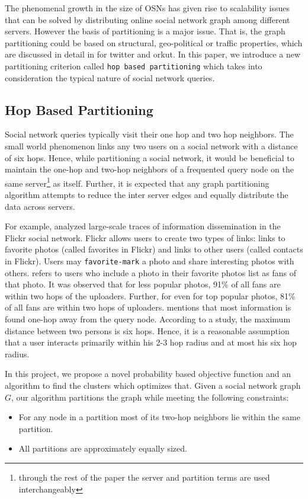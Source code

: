\documentclass[letterpaper]{article}
\begin{document}
    The phenomenal growth in the size of OSNs has given rise to scalability issues that can be solved by distributing online social network graph among different servers. However the basis of partitioning  is a major issue. That is, the graph partitioning could be based on structural, geo-political or traffic properties, which are discussed in detail in \cite{arxviv} for twitter and orkut. In this paper, we introduce a new partitioning criterion called \texttt{hop based partitioning} which takes into consideration the typical nature of social network queries.

\subsection{Hop Based Partitioning}

Social network queries typically visit their one hop and two hop neighbors. The small world phenomenon links any two users on a social network with a distance of six hops. Hence, while partitioning a social network, it would be beneficial to maintain the one-hop and two-hop neighbors of a frequented query node on the same server\footnote{through the rest of the paper the server and partition terms are used interchangeably} as itself. Further, it is expected that any graph partitioning algorithm attempts to reduce the inter server edges and equally distribute the data across servers.

For example, \cite{flickr} analyzed large-scale traces of information
dissemination in the Flickr social network. Flickr allows users to create two types of links: links to favorite
photos (called favorites in Flickr) and links to other users (called contacts in Flickr). Users may \texttt{favorite-mark} a photo
 and share interesting photos with others. \cite{flickr} refers to users who include a photo in their favorite photos list as fans of that photo. It was observed that for less popular photos, 91\% of all fans are within two hops of the uploaders. Further, for even for top popular photos, 81\% of all fans are within two hops of uploaders. \cite{OHM} mentions that most information is found one-hop away from the query node. According to a study\cite{4}, the maximum distance between two persons is six hops. Hence, it is a reasonable assumption that a user interacts primarily within his 2-3 hop radius and at most his six hop radius.

    In this project, we propose a novel probability based objective function and  an algorithm to find 
the clusters which optimizes that. Given a social network graph $G$, our algorithm partitions the graph while 
meeting the following constraints:
\begin{itemize}
\item For any node in a partition most of its two-hop neighbors lie within the same partition.
\item All partitions are approximately equally sized.
\end{itemize} 
\end{document}
